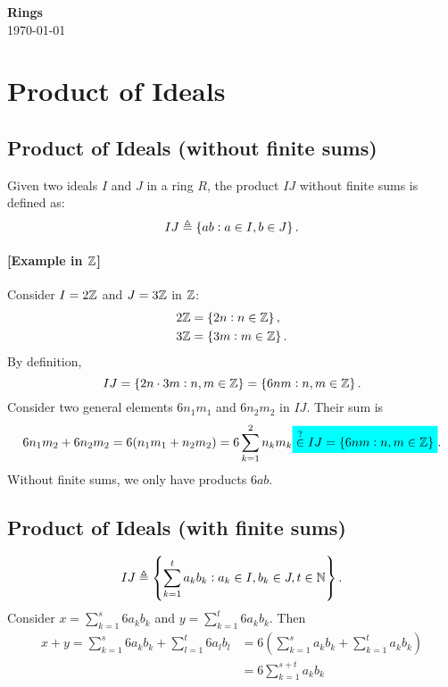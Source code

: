 \documentclass[11pt,openany]{article}
\begin{document}
	\begin{center}
		\huge\textbf{Rings}\\
		\vspace{0.5em}
		\vspace{0.5em}
		\normalsize{\today}\\
	\end{center}
	
	\begin{center}
		
	\end{center}
	
	\newpage
	
	\section*{Product of Ideals}
	\subsection*{Product of Ideals (without finite sums)}
	Given two ideals $I$ and $J$ in a ring $R$, the product $IJ$ without finite sums is defined as: \[
	IJ\triangleq\set{ab:a\in I,b\in J}.
	\]
	\paragraph{[Example in $\mathbb{Z}$]}
	
	Consider $I=2\mathbb{Z}$ and $J=3\mathbb{Z}$ in $\mathbb{Z}$: \begin{align*}
		2\mathbb{Z}&=\set{2n:n\in\mathbb{Z}},\\
		3\mathbb{Z}&=\set{3m:m\in\mathbb{Z}}.
	\end{align*} By definition, \[
	IJ=\set{2n\cdot 3m:n,m\in\mathbb{Z}}=\set{6nm:n,m\in\mathbb{Z}}.
	\] Consider two general elements $6n_1m_1$ and $6n_2m_2$ in $IJ$.
	Their sum is \[
	6n_1m_2+6n_2m_2=6(n_1m_1+n_2m_2)=6\sum_{k=1}^{2}n_km_k\mathcolorbox{-red}{\overset{?}{\in}IJ=\set{6nm:n,m\in\Z}}.
	\] Without finite sums, we only have products $6ab$.
	\subsection*{Product of Ideals (with finite sums)}
	\[
	IJ\triangleq\set{\sum_{k=1}^ta_kb_k:a_k\in I,b_k\in J,t\in\mathbb{N}}.
	\] Consider $x=\sum_{k=1}^s6a_kb_k$ and $y=\sum_{k=1}^t6a_kb_k$. Then \begin{align*}
		x+y=\sum_{k=1}^s6a_kb_k+\sum_{l=1}^t6a_lb_l&=6\left(\sum_{k=1}^sa_kb_k+\sum_{k=1}^ta_kb_k\right)
		\\&=6\sum_{k=1}^{s+t}a_kb_k
	\end{align*}
	\newpage
\end{document}
